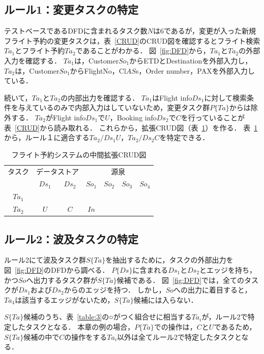 
\subsection{ルール1：変更タスクの特定}
テストベースであるDFDに含まれるタスク数$N$は6であるが，変更が入った新規フライト予約の変更タスクは，表~\ref{CRUD}のCRUD図を確認するとフライト検索$Ta_1$とフライト予約$Ta_2$であることがわかる．
図~\ref{fig:DFD}から，$Ta_1$と$Ta_2$の外部入力を確認する．
$Ta_1$は，Customer$So_1$からETDとDestinationを外部入力し，$Ta_2$は，Customer$So_1$からFlightNo，Cl$AS$s，Order number，PAXを外部入力している．

続いて，$Ta_1$と$Ta_2$の内部出力を確認する．
$Ta_1$はFlight info$Ds_1$に対して検索条件を与えているのみで内部入力はしていないため，変更タスク群$P\{Ta\}$からは除外する．
$Ta_2$がFlight info$Ds_1$で$U$，Booking info$Ds_2$で$C$を行っていることが表~\ref{CRUD}から読み取れる．
これらから，拡張CRUD図（表~\ref{ECRUD1}）を作る．
表~\ref{ECRUD1}から，ルール１に適合する$Ta_2/Ds_1U$，$Ta_2/Ds_2C$を特定できる．

\begin{table}[t]
\caption{フライト予約システムの中間拡張CRUD図}
\label{ECRUD1}
\begin{center}
\begin{tabular}{c||c|c||c|c|c|c}
\hline
タスク&\multicolumn{2}{c||}{データストア}&\multicolumn{4}{c}{源泉}\\
&$Ds_1$&$Ds_2$&$So_1$&$So_2$&$So_3$&$So_4$\\
\hline\hline
$Ta_1$&&&&&&\\
\hline
$Ta_2$&$U$&$C$&$In$&&&\\
\hline
\end{tabular}
\end{center}
\end{table}%

\subsection{ルール2：波及タスクの特定}
ルール2にて波及タスク群$S\{Ta\}$を抽出するために，タスクの外部出力を図~\ref{fig:DFD}のDFDから調べる．
$P\{Ds\}$に含まれる$Ds_1$と$Ds_2$とエッジを持ち，かつ$So$へ出力するタスク群が$S\{Ta\}$候補である．
図~\ref{fig:DFD}では，全てのタスクが$Ds_1$および$Ds_2$からのエッジを持つ．
しかし，$So$への出力に着目すると，$Ta_4$は該当するエッジがないため，$S\{Ta\}$候補には入らない．

$S\{Ta\}$候補のうち、表~\ref{table:3}の○がつく組合せに相当する$Ta_i$が，ルール2で特定したタスクとなる．
本章の例の場合，$P\{Ta\}$での操作は，$C$と$U$であるため，$S\{Ta\}$候補の中で$C$の操作をする$Ta_i$以外は全てルール2で特定したタスクとなる．

